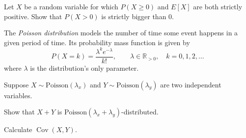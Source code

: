 \documentclass[a4paper,10pt,landscape,twocolumn]{scrartcl}
\DeclareMathOperator{\Cov}{Cov}
\begin{document}
\begin{exercise}[]
Let $X$ be a random variable for which $P(X\ge 0)$ and $E[X]$ are both strictly positive. Show that $P(X>0)$ is strictly bigger than $0$.
\end{exercise}

\begin{exercise}
The \emph{Poisson distribution} 	models the number of time some event happens in a given period of time. Its probability mass function is given by
\[
P(X = k) = {\frac {\lambda ^{k}e^{-\lambda }}{k!}}, \qquad \lambda \in \mathbb{R}_{>0}, \quad k=0,1,2,\dots
\]
where $\lambda$ is the distribution's only parameter.

Suppose $X \sim \text{Poisson}(\lambda_x)$ and $Y \sim \text{Poisson}(\lambda_y)$ are two independent variables. 

	\begin{subex}
	Show that $X+Y$ is $\text{Poisson}(\lambda_x + \lambda_y)$-distributed.
	\end{subex}
	
	\begin{subex}
	Calculate $\Cov(X, Y)$.
	\end{subex}
\end{exercise}


\vfill
{}
\end{document}
